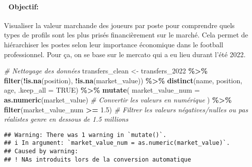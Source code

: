 \documentclass[
]{article}
\newenvironment{Shaded}{\begin{snugshade}}{\end{snugshade}}
\newcommand{\AttributeTok}[1]{\textcolor[rgb]{0.13,0.29,0.53}{#1}}
\newcommand{\CommentTok}[1]{\textcolor[rgb]{0.56,0.35,0.01}{\textit{#1}}}
\newcommand{\ConstantTok}[1]{\textcolor[rgb]{0.56,0.35,0.01}{#1}}
\newcommand{\FloatTok}[1]{\textcolor[rgb]{0.00,0.00,0.81}{#1}}
\newcommand{\FunctionTok}[1]{\textcolor[rgb]{0.13,0.29,0.53}{\textbf{#1}}}
\newcommand{\NormalTok}[1]{#1}
\newcommand{\OtherTok}[1]{\textcolor[rgb]{0.56,0.35,0.01}{#1}}
\newcommand{\SpecialCharTok}[1]{\textcolor[rgb]{0.81,0.36,0.00}{\textbf{#1}}}
\begin{document}
\paragraph{🎯 Objectif:}\label{objectif-1}

Visualiser la valeur marchande des joueurs par poste pour comprendre
quels types de profils sont les plus prisés financièrement sur le
marché. Cela permet de hiérarchiser les postes selon leur importance
économique dans le football professionnel. Pour ça, on se base sur le
mercato qui a eu lieu durant l'été 2022.

\begin{Shaded}
\begin{Highlighting}[]
\CommentTok{\# Nettoyage des données}
\NormalTok{transfers\_clean }\OtherTok{\textless{}{-}}\NormalTok{ transfers\_2022 }\SpecialCharTok{\%\textgreater{}\%}
  \FunctionTok{filter}\NormalTok{(}\SpecialCharTok{!}\FunctionTok{is.na}\NormalTok{(position), }\SpecialCharTok{!}\FunctionTok{is.na}\NormalTok{(market\_value)) }\SpecialCharTok{\%\textgreater{}\%}
  \FunctionTok{distinct}\NormalTok{(name, position, age, }\AttributeTok{.keep\_all =} \ConstantTok{TRUE}\NormalTok{) }\SpecialCharTok{\%\textgreater{}\%}
  \FunctionTok{mutate}\NormalTok{(}
    \AttributeTok{market\_value\_num =} \FunctionTok{as.numeric}\NormalTok{(market\_value)  }\CommentTok{\# Convertir les valeurs en numérique}
\NormalTok{  ) }\SpecialCharTok{\%\textgreater{}\%}
  \FunctionTok{filter}\NormalTok{(market\_value\_num }\SpecialCharTok{\textgreater{}=} \FloatTok{1.5}\NormalTok{)  }\CommentTok{\# Filtrer les valeurs négatives/nulles ou pas réalistes genre en dessous de 1.5 millions}
\end{Highlighting}
\end{Shaded}

\begin{verbatim}
## Warning: There was 1 warning in `mutate()`.
## i In argument: `market_value_num = as.numeric(market_value)`.
## Caused by warning:
## ! NAs introduits lors de la conversion automatique
\end{verbatim}
\end{document}
